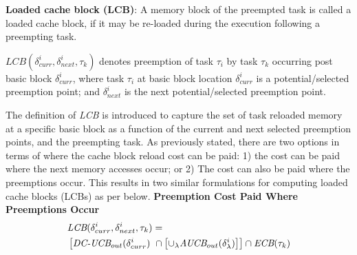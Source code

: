 \begin{definition}
\textbf{Loaded cache block (LCB)}: A memory block of the preempted task is called a loaded cache block, if it may be re-loaded during the execution following a preempting task.
\end{definition}
\noindent
\begin{math}\textit{LCB}(\delta_{curr}^{i},\delta_{next}^{i},\tau_{k})\end{math} denotes preemption of task \begin{math}\tau_{i}\end{math} by task \begin{math}\tau_{k}\end{math} occurring post basic block \begin{math}\delta_{curr}^{i}\end{math}, where task \begin{math}\tau_{i}\end{math} at basic block location \begin{math}\delta_{curr}^{i}\end{math} is a potential/selected preemption point; and \begin{math}\delta_{next}^{i}\end{math} is the next potential/selected preemption point.

The definition of \textit{LCB} is introduced to capture the set of task reloaded memory at a specific basic block as a function of the current and next selected preemption points, and the preempting task.  As previously stated, there are two options in terms of where the cache block reload cost can be paid: 1) the cost can be paid where the next memory accesses occur; or 2) The cost can also be paid where the preemptions occur.  This results in two similar formulations for computing loaded cache blocks (LCBs) as per below.
\newline
\newline
\noindent\textbf{Preemption Cost Paid Where Preemptions Occur}
\begin{equation}\label{eqn:lcb-formula-1}
\begin{split}
    \lefteqn{\textit{LCB}(\delta_{curr}^{i},\delta_{next}^{i},\tau_{k}) =} & \\
    &\left[\textit{DC-UCB}_{out}(\delta_{curr}^{i})\ \cap \left[\cup_\lambda \textit{AUCB}_{out}(\delta_{\lambda}^{i})\right]\right] \cap \textit{ECB}(\tau_{k})\\
\end{split}
\end{equation}

